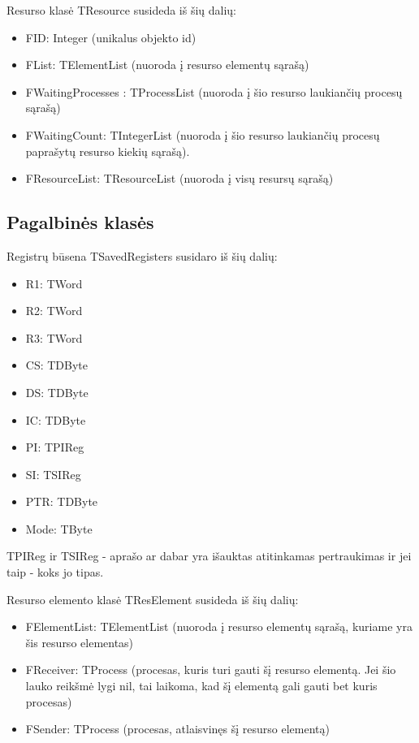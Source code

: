 \documentclass{VUMIFInfKursinis}
\begin{document}
Resurso klasė TResource susideda iš šių dalių:

\begin{itemize}
	\item FID: Integer (unikalus objekto id)
	\item FList: TElementList (nuoroda į resurso elementų sąrašą)
	\item FWaitingProcesses : TProcessList (nuoroda į šio resurso laukiančių procesų sąrašą)
	\item FWaitingCount: TIntegerList (nuoroda į šio resurso laukiančių procesų paprašytų
	resurso kiekių sąrašą).
	\item FResourceList: TResourceList (nuoroda į visų resursų sąrašą)
\end{itemize}

\subsection{Pagalbinės klasės}

Registrų būsena TSavedRegisters susidaro iš šių dalių:

\begin{itemize}
	\item R1: TWord
	\item R2: TWord
	\item R3: TWord
	\item CS: TDByte
	\item DS: TDByte
	\item IC: TDByte
	\item PI: TPIReg
	\item SI: TSIReg
	\item PTR: TDByte
	\item Mode: TByte
\end{itemize}

TPIReg ir TSIReg - aprašo ar dabar yra išauktas atitinkamas pertraukimas ir jei taip - koks jo tipas.

Resurso elemento klasė TResElement susideda iš šių dalių:

\begin{itemize}
	\item FElementList: TElementList (nuoroda į resurso elementų sąrašą, kuriame yra šis resurso elementas)
	\item FReceiver: TProcess (procesas, kuris turi gauti šį resurso elementą. Jei šio lauko
reikšmė lygi nil, tai laikoma, kad šį elementą gali gauti bet kuris procesas)
	\item FSender: TProcess (procesas, atlaisvinęs šį resurso elementą)
\end{itemize}

\printbibliography[heading=bibintoc] %
\appendix  %
\end{document}
